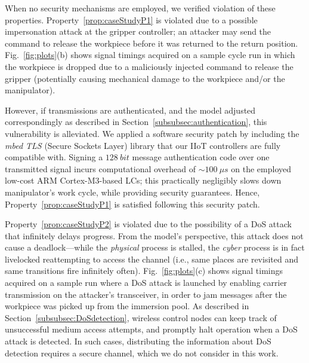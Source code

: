 When no security mechanisms are employed, we verified violation of these properties.  Property~\ref{prop:caseStudyP1} is violated due to a possible impersonation attack at the gripper controller; an attacker may send the command to release the workpiece before it was returned to the return position. Fig.~\ref{fig:plots}(b) shows signal timings acquired on a sample cycle run in which the workpiece is dropped due to a maliciously injected command to release the gripper (potentially causing mechanical damage to the workpiece and/or the manipulator).

However, if transmissions are authenticated, and the model adjusted correspondingly as described in Section~\ref{subsubsec:authentication}, this vulnerability is alleviated. We applied a software security patch by including the \emph{mbed TLS} (Secure Sockets Layer) library that our IIoT controllers are fully compatible with. Signing a $128~bit$ message authentication code over one transmitted signal incurs computational overhead of $\sim100~\mu s$ on the employed low-cost ARM Cortex-M3-based LCs; this practically negligibly slows down manipulator's work cycle, while providing security guarantees. Hence, Property~\ref{prop:caseStudyP1} is satisfied following this security patch.

Property~\ref{prop:caseStudyP2} is violated due to the possibility of a DoS attack that infinitely delays progress. From the model's perspective, this attack does not cause a deadlock---while the \emph{physical} process is stalled, the \emph{cyber} process is in fact livelocked reattempting to access the channel (i.e., same places are revisited and same transitions fire infinitely often). Fig.~\ref{fig:plots}(c) shows signal timings acquired on a sample run where a DoS attack is launched by enabling carrier transmission on the attacker's transceiver, in order to jam messages after the workpiece was picked up from the immersion pool. As described in Section~\ref{subsubsec:DoSdetection}, wireless control nodes can keep track of unsuccessful medium access attempts, and promptly halt operation when a DoS attack is detected.
%
In such cases, distributing the information about DoS detection requires a secure channel, which we do not consider in this work.










